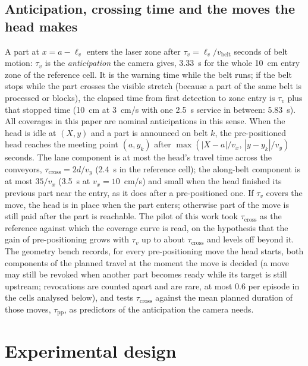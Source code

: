 \documentclass[11pt,a4paper]{article}
\newcommand{\tcross}{\tau_{\mathrm{cross}}}
\newcommand{\tpp}{\tau_{\mathrm{pp}}}
\newcommand{\tv}{\tau_{v}}
\newcommand{\lv}{\ell_{v}}
\newcommand{\vb}{v_{\mathrm{belt}}}
\begin{document}
\subsection{Anticipation, crossing time and the moves the head makes}\label{sec:anticipation}
A part at $x=a-\lv$ enters the laser zone after $\tv=\lv/\vb$ seconds of belt motion:
$\tv$ is the \emph{anticipation} the camera gives, 3.33~s for the whole 10~cm entry zone of
the reference cell. It is the warning time while the belt runs; if the belt stops while the
part crosses the visible stretch (because a part of the same belt is processed or blocks),
the elapsed time from first detection to zone entry is $\tv$ plus that stopped time (10~cm
at 3~cm/s with one 2.5~s service in between: 5.83~s). All coverages in this paper are
nominal anticipations in this sense. When the head is idle at $(X,y)$ and a part is announced on belt $k$, the
pre-positioned head reaches the meeting point $(a,y_k)$ after
$\max(|X-a|/v_x,\,|y-y_k|/v_y)$ seconds. The lane component is at most the head's
travel time across the conveyors, $\tcross=2d/v_y$ (2.4~s in the reference cell); the
along-belt component is at most $35/v_x$ (3.5~s at $v_x=10$~cm/s) and small when the
head finished its previous part near the entry, as it does after a pre-positioned one.
If $\tv$ covers the move, the head is in place when the part enters; otherwise part of
the move is still paid after the part is reachable. The pilot of this work took
$\tcross$ as the reference against which the coverage curve is read, on the hypothesis
that the gain of pre-positioning grows with $\tv$ up to about $\tcross$ and levels off
beyond it. The geometry bench records, for every pre-positioning move the head starts, both
components of the planned travel at the moment the move is decided (a move may still be
revoked when another part becomes ready while its target is still upstream; revocations
are counted apart and are rare, at most
0.6 per episode in the cells analysed below), and tests $\tcross$ against the mean planned
duration of those moves, $\tpp$, as predictors of the anticipation the camera needs.

\section{Experimental design}\label{sec:design}
\end{document}

